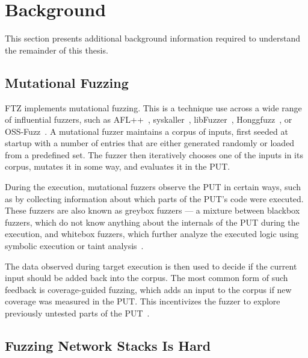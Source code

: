 \documentclass[twocolumn]{article}
\newcommand{\proj}{FTZ\xspace}
\let\savedCite=\cite
\renewcommand{\cite}{\unskip~\savedCite}
\begin{document}


\raggedbottom\pagebreak

\section{Background}
\label{Background}

This section presents additional background information required to understand the remainder of this thesis.

\subsection{Mutational Fuzzing}

\label{Background:MutationalFuzzing}
\proj implements mutational fuzzing. This is a technique use across a wide range of influential fuzzers, such as AFL++\cite{AFLPlusPlus}, syskaller\cite{syskaller}, libFuzzer\cite{libFuzzer}, Honggfuzz\cite{hongfuzz}, or OSS-Fuzz\cite{OSSFuzz}. A mutational fuzzer maintains a corpus of inputs, first seeded at startup with a number of entries that are either generated randomly or loaded from a predefined set. The fuzzer then iteratively chooses one of the inputs in its corpus, mutates it in some way, and evaluates it in the PUT.

During the execution, mutational fuzzers observe the PUT in certain ways, such as by collecting information about which parts of the PUT's code were executed. These fuzzers are also known as greybox fuzzers — a mixture between blackbox fuzzers, which do not know anything about the internals of the PUT during the execution, and whitebox fuzzers, which further analyze the executed logic using symbolic execution or taint analysis\cite{Demystifying}.

The data observed during target execution is then used to decide if the current input should be added back into the corpus. The most common form of such feedback is coverage-guided fuzzing, which adds an input to the corpus if new coverage was measured in the PUT. This incentivizes the fuzzer to explore previously untested parts of the PUT\cite{AFLPlusPlus}.

\subsection{Fuzzing Network Stacks Is Hard}
\label{Background:FuzzingNetworkStacksIsHard}
\end{document}
